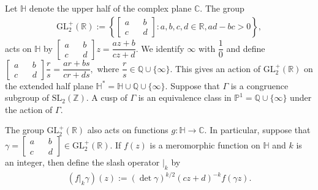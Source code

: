 \documentclass[12pt]{amsart}
\theoremstyle{plain}
\theoremstyle{definition}
\begin{document}
	
	Let $\mathbb{H}$ denote the upper half of the complex plane $\mathbb{C}$. The group 
	\begin{align*}
		\mathrm{GL_2^{+}}(\mathbb{R}):= \left\{ \begin{bmatrix}
			a && b \\c && d
		\end{bmatrix}: a, b, c, d \in \mathbb{R}, ad-bc>0 \right\},
	\end{align*}
	acts on $\mathbb{H}$ by $ \begin{bmatrix}
		a && b \\c && d
	\end{bmatrix} z = \dfrac{az+b}{cz+d}.$ We identify $\infty$ with $\dfrac{1}{0}$ and define $ \begin{bmatrix}
		a && b \\c && d
	\end{bmatrix} \dfrac{r}{s} = \dfrac{ar+bs}{cr+ds},$ where $\dfrac{r}{s} \in \mathbb{Q} \cup \{ \infty\}$. This gives an action of $\mathrm{GL_2^{+}}(\mathbb{R})$ on the extended half plane $\mathbb{H}^{*}=\mathbb{H} \cup \mathbb{Q} \cup \{\infty\}$. Suppose that $\Gamma$ is a congruence subgroup of $\mathrm{SL_2}(\mathbb{Z})$. A cusp of $\Gamma$ is an equivalence class in $\mathbb{P}^{1}=\mathbb{Q} \cup \{\infty\}$ under the action of $\Gamma$.
	
	The group $\mathrm{GL_2^{+}}(\mathbb{R})$ also acts on functions $g:\mathbb{H} \rightarrow \mathbb{C}$. In particular, suppose that $\gamma=\begin{bmatrix}
		a && b \\c && d
	\end{bmatrix}\in \mathrm{GL_2^{+}}(\mathbb{R})$. If $f(z)$ is a meromorphic function on $\mathbb{H}$ and $k$ is an integer, then define the slash operator $|_{k}$ by
	\begin{align*}
		(f|_{k} \gamma)(z):= (\det \gamma)^{k/2} (cz+d)^{-k} f(\gamma z).
	\end{align*}
	
\end{document}
